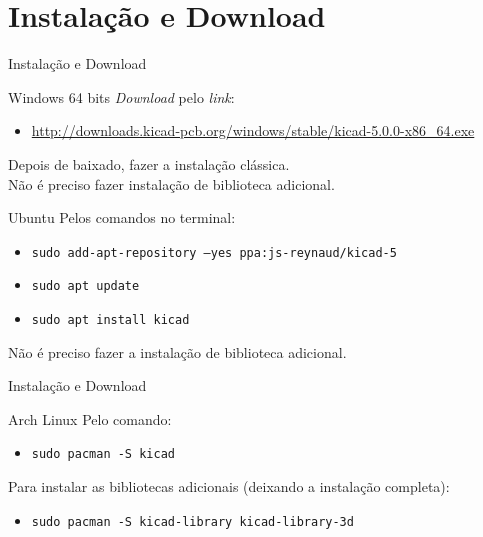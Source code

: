 \documentclass{beamer}
\begin{document}
\section{Instalação e Download}
\begin{frame}{Instalação e Download}
	\begin{block}{Windows 64 bits}
		\textit{Download} pelo \textit{link}:
		\begin{itemize}
			\item \url{http://downloads.kicad-pcb.org/windows/stable/kicad-5.0.0-x86\_64.exe}
		\end{itemize}
		Depois de baixado, fazer a instalação clássica.\\
		Não é preciso fazer instalação de biblioteca adicional.
	\end{block}
	\begin{block}{Ubuntu}
		Pelos comandos no terminal:
		\begin{itemize}
			\item \texttt{sudo add-apt-repository --yes ppa:js-reynaud/kicad-5}
			\item \texttt{sudo apt update}
		\item \texttt{sudo apt install kicad}
		\end{itemize}
		Não é preciso fazer a instalação de biblioteca adicional.
	\end{block}
\end{frame}

\begin{frame}{Instalação e Download}
	\begin{block}{Arch Linux}
		Pelo comando:
		\begin{itemize}
			\item \texttt{sudo pacman -S kicad}
		\end{itemize}
		Para instalar as bibliotecas adicionais (deixando a instalação completa):
		\begin{itemize}
			\item \texttt{sudo pacman -S kicad-library kicad-library-3d}
		\end{itemize}
	\end{block}
\end{frame}

\begin{frame}
  \titlepage
\end{frame}
\end{document}
